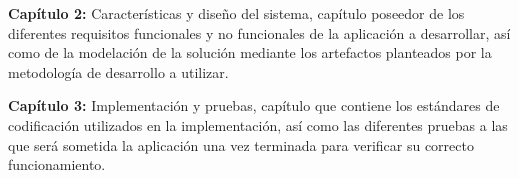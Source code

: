\textbf{Capítulo 2:} Características y diseño del sistema, capítulo poseedor de los diferentes requisitos
funcionales y no funcionales de la aplicación a desarrollar, así como de la modelación de la
solución mediante los artefactos planteados por la metodología de desarrollo a utilizar.

\textbf{Capítulo 3:} Implementación y pruebas, capítulo que contiene los estándares de codificación
utilizados en la implementación, así como las diferentes pruebas a las que será sometida la
aplicación una vez terminada para verificar su correcto funcionamiento.
